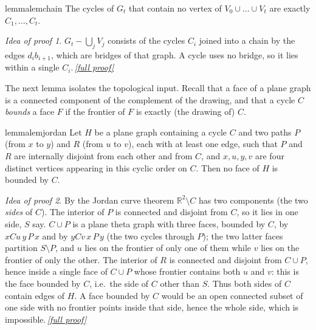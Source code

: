 \documentclass[11pt,a4paper]{article}
\theoremstyle{plain}
\theoremstyle{definition}
\theoremstyle{remark}
\newtheorem*{proofidea}{Idea of proof}
\newcommand{\fullproofref}[1]{\,\hyperref[#1]{\textit{[full proof]}}}
\newcommand{\Gtt}{G_t}
\begin{document}
\begin{restatable}{lemma}{lemchain}\label{lem:chain}
The cycles of $\Gtt$ that contain no vertex of $V_0\cup\dots\cup V_t$ are exactly $C_1,\dots,C_t$.
\end{restatable}
\begin{proofidea}
$\Gtt-\bigcup_jV_j$ consists of the cycles $C_i$ joined into a chain by the edges $d_ib_{i+1}$, which are bridges of that graph. A cycle uses no bridge, so it lies within a single $C_i$.\fullproofref{pf:chain}
\end{proofidea}

The next lemma isolates the topological input. Recall that a face of a plane graph is a connected component of the complement of the drawing, and that a cycle $C$ \emph{bounds} a face $F$ if the frontier of $F$ is exactly (the drawing of) $C$.

\begin{restatable}{lemma}{lemjordan}\label{lem:jordan}
Let $H$ be a plane graph containing a cycle $C$ and two paths $P$ (from $x$ to $y$) and $R$ (from $u$ to $v$), each with at least one edge, such that $P$ and $R$ are internally disjoint from each other and from $C$, and $x,u,y,v$ are four distinct vertices appearing in this cyclic order on $C$. Then no face of $H$ is bounded by $C$.
\end{restatable}
\begin{proofidea}
By the Jordan curve theorem $\mathbb R^2\setminus C$ has two components (the two \emph{sides} of $C$). The interior of $P$ is connected and disjoint from $C$, so it lies in one side, $S$ say. $C\cup P$ is a plane theta graph with three faces, bounded by $C$, by $xCu\,y\,P\,x$ and by $yCv\,x\,P\,y$ (the two cycles through $P$); the two latter faces partition $S\setminus P$, and $u$ lies on the frontier of only one of them while $v$ lies on the frontier of only the other. The interior of $R$ is connected and disjoint from $C\cup P$, hence inside a single face of $C\cup P$ whose frontier contains both $u$ and $v$: this is the face bounded by $C$, i.e.\ the side of $C$ other than $S$. Thus both sides of $C$ contain edges of $H$. A face bounded by $C$ would be an open connected subset of one side with no frontier points inside that side, hence the whole side, which is impossible.\fullproofref{pf:jordan}
\end{proofidea}
\end{document}
